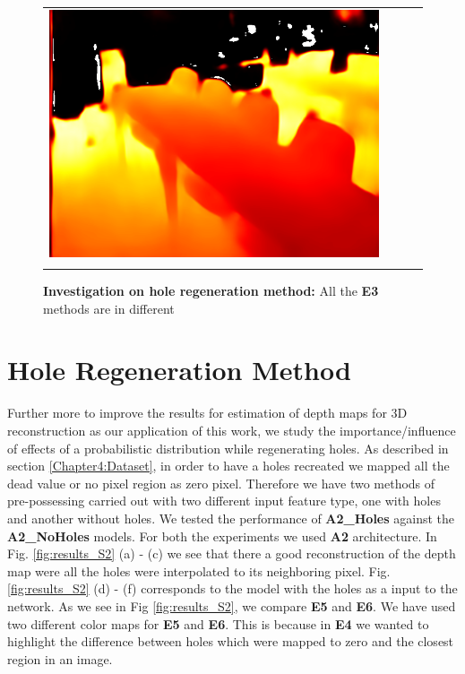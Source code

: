 \begin{figure}
\begin{tabular}{@{}c@{ }c@{ }c@{ }c@{}}
\includegraphics[width=.3\linewidth]{Figures/results/s3_noNyu/2Predicted.png}\\[-1ex]
&\mycaption{} & \mycaption{} & \mycaption{} \\
\end{tabular}
\caption{\textbf{Investigation on hole regeneration method:} All the \textbf{E3} methods are in different  }%
\label{figure1}
\end{figure}









 \section{Hole Regeneration Method}
 \label{Chapter6:Hole_Regeneration}
Further more to improve the results for estimation of depth maps for 3D reconstruction as our application of this work, we study the importance/influence of effects of a probabilistic distribution while regenerating holes. As described in section \ref{Chapter4:Dataset}, in order to have a holes recreated we mapped all the dead value or no pixel region as zero pixel. Therefore we have two methods of pre-possessing carried out with two different input feature type, one with holes and another without holes. We tested the performance of \textbf{A2\_Holes} against the \textbf{A2\_NoHoles} models. For both the experiments we used \textbf{A2} architecture.  In Fig. \ref{fig:results_S2} (a) - (c) we see that there a good reconstruction of the depth map were all the holes were interpolated to its neighboring pixel.  Fig. \ref{fig:results_S2} (d) - (f)  corresponds to the model with the holes as a input to the network. As we see in Fig \ref{fig:results_S2}, we compare \textbf{E5} and \textbf{E6}. We have used two different color maps for \textbf{E5} and \textbf{E6}. This is because in \textbf{E4} we wanted to highlight the difference between holes which were mapped to zero and the closest region in an image. 


